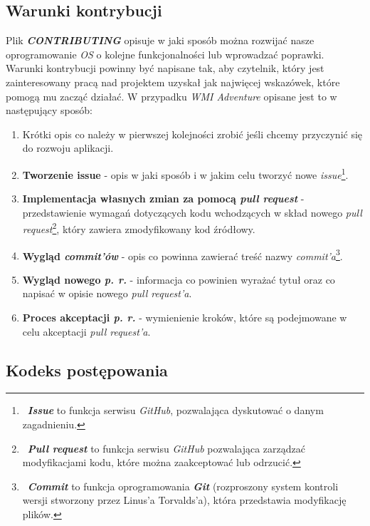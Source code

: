 \documentclass{article}
\begin{document}
\subsection{Warunki kontrybucji}

\hspace{4mm} Plik \textbf{\emph{CONTRIBUTING}} opisuje w jaki sposób można rozwijać nasze oprogramowanie \emph{OS} o kolejne funkcjonalności lub wprowadzać poprawki. Warunki kontrybucji powinny być napisane tak, aby czytelnik, który jest zainteresowany pracą nad projektem uzyskał jak najwięcej wskazówek, które pomogą mu zacząć działać. W przypadku \emph{WMI Adventure} opisane jest to w następujący sposób:
\begin{enumerate}
    \item Krótki opis co należy w pierwszej kolejności zrobić jeśli chcemy przyczynić się do rozwoju aplikacji.
    \item \textbf{Tworzenie issue} - opis w jaki sposób i w jakim celu tworzyć nowe \emph{issue}\footnote{\, \textbf{\emph{Issue}} to funkcja serwisu \emph{GitHub}, pozwalająca dyskutować o danym zagadnieniu.}.
    \item \textbf{Implementacja własnych zmian za pomocą \emph{pull request}} -\newline przedstawienie wymagań dotyczących kodu wchodzących w skład nowego \emph{pull request}\footnote{\, \textbf{\emph{Pull request}} to funkcja serwisu \emph{GitHub} pozwalająca zarządzać modyfikacjami kodu, które można zaakceptować lub odrzucić.}, który zawiera zmodyfikowany kod źródłowy.
    \item \textbf{Wygląd \emph{commit'ów}} - opis co powinna zawierać treść nazwy \emph{commit'a}\footnote{\, \textbf{\emph{Commit}} to funkcja oprogramowania \textbf{\emph{Git}} (rozproszony system kontroli wersji stworzony przez Linus'a Torvalds'a\cite{git.wiki}), która przedstawia modyfikację plików.}.
    \item \textbf{Wygląd nowego \emph{p. r.}} - informacja co powinien wyrażać tytuł oraz co napisać w opisie nowego \emph{pull request'a}.
    \item \textbf{Proces akceptacji \emph{p. r.}} - wymienienie kroków, które są podejmowane w celu akceptacji \emph{pull request'a}.
\end{enumerate}

\subsection{Kodeks postępowania}
\end{document}
